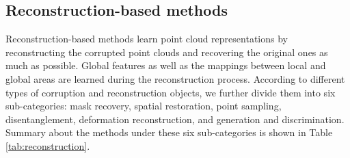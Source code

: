 \documentclass[a4paper,fleqn]{cas-dc}
\begin{document}
\subsection{Reconstruction-based methods}
Reconstruction-based methods learn point cloud representations by reconstructing the corrupted point clouds and recovering the original ones as much as possible. Global features as well as the mappings between local and global areas are learned during the reconstruction process. According to different types of corruption and reconstruction objects, we further divide them into six sub-categories: mask recovery, spatial restoration, point sampling, disentanglement, deformation reconstruction, and generation and discrimination. Summary about the methods under these six sub-categories is shown in Table \ref{tab:reconstruction}.
\end{document}

